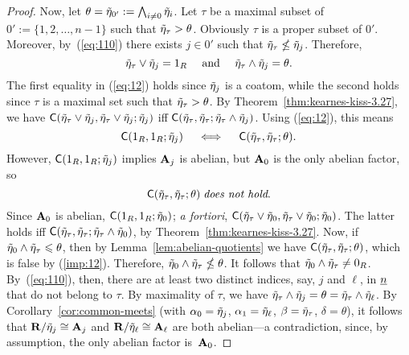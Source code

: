 \begin{proof}
    Now, let $\theta = \tilde{\eta}_{0'} := \bigwedge_{i \neq 0} \tilde{\eta}_i$.
    Let $\tau$ be a maximal subset of $0':=\{1,2,\dots, n-1\}$ such that 
    $\tilde{\eta}_\tau > \theta$.  
    Obviously $\tau$ is a proper subset of $0'$. Moreover, by~(\ref{eq:110})
    there exists $j\in 0'$ such that $\tilde{\eta}_\tau \nleq \tilde{\eta}_j$. 
    Therefore,
    \begin{equation}
      \label{eq:12}
      \etaR_\tau \join \etaR_j = 1_R\quad \text{ and } \quad
      \etaR_\tau \meet \etaR_j = \theta.
    \end{equation}
    The first equality in (\ref{eq:12}) holds since $\tilde{\eta}_j$ is a coatom,
    while the second holds since $\tau$ is a maximal set such that
    $\tilde{\eta}_{\tau}> \theta$.
    By Theorem~\ref{thm:kearnes-kiss-3.27}, we have
    $\mathsf{C}(\tilde{\eta}_\tau \vee \tilde{\eta}_j,  \tilde{\eta}_\tau \vee \tilde{\eta}_j;  \tilde{\eta}_j)$ iff
    $\mathsf{C}(\tilde{\eta}_\tau,  \tilde{\eta}_\tau;   \tilde{\eta}_\tau \wedge \tilde{\eta}_j)$. Using (\ref{eq:12}), this means
    \[
    \mathsf{C}(1_R,  1_R;  \tilde{\eta}_j) \quad
    \iff \quad
    \mathsf{C}(\tilde{\eta}_\tau,  \tilde{\eta}_\tau;   \theta).
    \]
    However, $\mathsf{C}(1_R,  1_R;  \tilde{\eta}_j)$ implies $\mathbf{A}_j$ is abelian, but
    $\mathbf{A}_0$ is the only abelian factor, so
    \begin{equation}
      \label{imp:12}
      \CC{\etaR_\tau}{ \etaR_\tau}{  \theta} \; \text{{\it does not hold}}.  
    \end{equation}
    Since $\mathbf{A}_0$ is abelian,
    $\mathsf{C}( 1_R,  1_R;  \tilde{\eta}_0)$; {\it a fortiori},
    $\mathsf{C}(\tilde{\eta}_\tau \vee \tilde{\eta}_0,  \tilde{\eta}_\tau \vee \tilde{\eta}_0;  \tilde{\eta}_0)$.
    The latter holds iff 
    $\mathsf{C}(\tilde{\eta}_\tau,  \tilde{\eta}_\tau;   \tilde{\eta}_\tau \wedge \tilde{\eta}_0)$, 
    by Theorem~\ref{thm:kearnes-kiss-3.27}.
    Now, if $\tilde{\eta}_0 \wedge \tilde{\eta}_\tau \leqslant \theta$, then by
    Lemma~\ref{lem:abelian-quotients} we have
    $\mathsf{C}(\tilde{\eta}_\tau,  \tilde{\eta}_\tau;  \theta)$, which is false by (\ref{imp:12}).
    Therefore, $\tilde{\eta}_0 \wedge \tilde{\eta}_\tau \nleq \theta$.
    It follows that $\tilde{\eta}_0 \wedge \tilde{\eta}_\tau \neq 0_R$. By~(\ref{eq:110}),
    then, there are at least two distinct indices, say, $j$ and $\ell$, in $\underline{n}$ 
    that do not belong to $\tau$.   By maximality of $\tau$, we have
    $\tilde{\eta}_\tau \wedge \tilde{\eta}_j = \theta = \tilde{\eta}_\tau \wedge \tilde{\eta}_\ell$.
     By Corollary~\ref{cor:common-meets} (with $\alpha_0 = \tilde{\eta}_j$, 
    $\alpha_1 = \tilde{\eta}_\ell$, $\beta = \tilde{\eta}_\tau$, $\delta = \theta$),
    it follows that $\mathbf{R}/\tilde{\eta}_j \cong \mathbf{A}_j$ and $\mathbf{R}/\tilde{\eta}_\ell \cong
    \mathbf{A}_\ell$ are both abelian---a contradiction,
    since, by assumption, the only abelian factor is~$\mathbf{A}_0$.
\end{proof}

